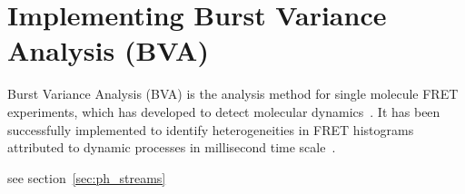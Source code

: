 \section{Implementing Burst Variance Analysis (BVA)}


Burst Variance Analysis (BVA) is the analysis method for single molecule FRET experiments, which has developed to detect molecular dynamics~\cite{Torella_2011}. It has been successfully implemented to identify heterogeneities in FRET histograms attributed to dynamic processes in millisecond time scale~\cite{Torella_2011}\cite{Robb_2013}.

see section~\ref{sec:ph_streams}